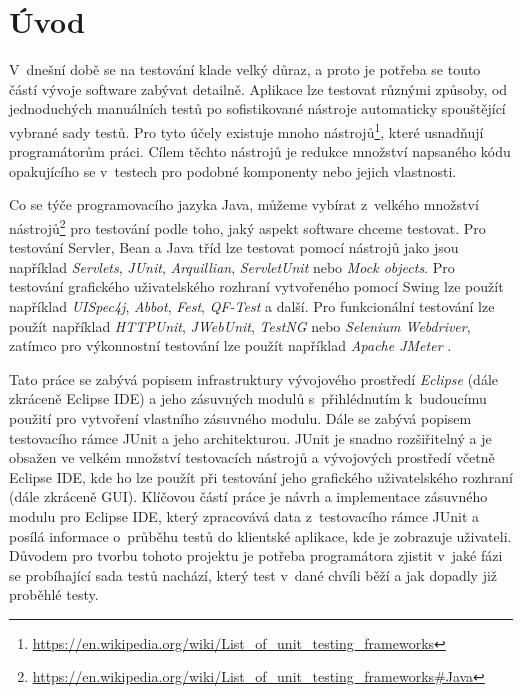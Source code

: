 \chapter{Úvod}                                                            %
V~dnešní době se na testování klade velký důraz, a proto je potřeba se touto částí vývoje software zabývat detailně. Aplikace lze testovat různými způsoby, od jednoduchých manuálních testů po sofistikované nástroje automaticky spouštějící vybrané sady testů. Pro tyto účely existuje mnoho nástrojů\footnote{\url{https://en.wikipedia.org/wiki/List_of_unit_testing_frameworks}}, které usnadňují programátorům práci. Cílem těchto nástrojů je redukce množství napsaného kódu opakujícího se v~testech pro podobné komponenty nebo jejich vlastnosti.

Co se týče programovacího jazyka Java, můžeme vybírat z~velkého množství nástrojů\footnote{\url{https://en.wikipedia.org/wiki/List_of_unit_testing_frameworks\#Java}} pro testování podle toho, jaký aspekt software chceme testovat. Pro testování Servler, Bean a Java tříd lze testovat pomocí nástrojů jako jsou například \emph{Servlets}, \emph{JUnit}, \emph{Arquillian}, \emph{ServletUnit} nebo \emph{Mock objects}. Pro testování grafického uživatelského rozhraní vytvořeného pomocí Swing lze použít například \emph{UISpec4j}, \emph{Abbot}, \emph{Fest}, \emph{QF-Test} a další. Pro funkcionální testování lze použít například \emph{HTTPUnit}, \emph{JWebUnit}, \emph{TestNG} nebo \emph{Selenium Webdriver}, zatímco pro výkonnostní testování lze použít například \emph{Apache JMeter} \cite{softwaretestinghelp}.

Tato práce se zabývá popisem infrastruktury vývojového prostředí \emph{Eclipse} (dále zkráceně Eclipse IDE) a jeho zásuvných modulů s~přihlédnutím k~budoucímu použití pro vytvoření vlastního zásuvného modulu. Dále se zabývá popisem testovacího rámce JUnit a jeho architekturou. JUnit je snadno rozšiřitelný a je obsažen ve velkém množství testovacích nástrojů a vývojových prostředí včetně Eclipse IDE, kde ho lze použít při testování jeho grafického uživatelského rozhraní (dále zkráceně GUI). Klíčovou částí práce je návrh a implementace zásuvného modulu pro Eclipse IDE, který zpracovává data z~testovacího rámce JUnit a posílá informace o~průběhu testů do klientské aplikace, kde je zobrazuje uživateli. Důvodem pro tvorbu tohoto projektu je potřeba programátora zjistit v~jaké fázi se probíhající sada testů nachází, který test v~dané chvíli běží a jak dopadly již proběhlé testy.


